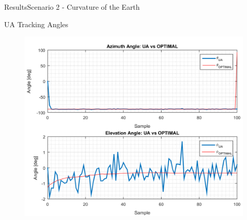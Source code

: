 \begin{frame}{Results}{Scenario 2 - Curvature of the Earth}
\begin{block}{UA Tracking Angles}
\begin{figure}[H]
{{    \includegraphics[scale=0.35]{figures/s2_ua.png}}}
  \end{figure}
  
  \end{block}

\end{frame}



